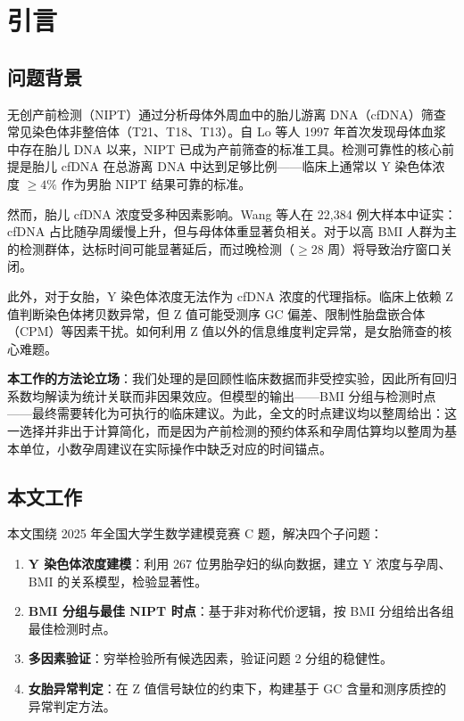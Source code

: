 \documentclass{mcm-paper}
\begin{document}
\tableofcontents
\newpage

\section{引言}

\subsection{问题背景}

无创产前检测（NIPT）通过分析母体外周血中的胎儿游离 DNA（cfDNA）筛查常见染色体非整倍体（T21、T18、T13）。自 Lo 等人 1997 年首次发现母体血浆中存在胎儿 DNA 以来\cite{lo1997}，NIPT 已成为产前筛查的标准工具。检测可靠性的核心前提是胎儿 cfDNA 在总游离 DNA 中达到足够比例——临床上通常以 Y 染色体浓度 $\geq 4\%$ 作为男胎 NIPT 结果可靠的标准。

然而，胎儿 cfDNA 浓度受多种因素影响。Wang 等人在 22,384 例大样本中证实\cite{wang2013}：cfDNA 占比随孕周缓慢上升，但与母体体重显著负相关。对于以高 BMI 人群为主的检测群体，达标时间可能显著延后，而过晚检测（$\geq 28$ 周）将导致治疗窗口关闭。

此外，对于女胎，Y 染色体浓度无法作为 cfDNA 浓度的代理指标。临床上依赖 Z 值判断染色体拷贝数异常，但 Z 值可能受测序 GC 偏差、限制性胎盘嵌合体（CPM）\cite{grati2014}等因素干扰。如何利用 Z 值以外的信息维度判定异常，是女胎筛查的核心难题。

\textbf{本工作的方法论立场}：我们处理的是回顾性临床数据而非受控实验，因此所有回归系数均解读为统计关联而非因果效应。但模型的输出——BMI 分组与检测时点——最终需要转化为可执行的临床建议。为此，全文的时点建议均以整周给出：这一选择并非出于计算简化，而是因为产前检测的预约体系和孕周估算均以整周为基本单位，小数孕周建议在实际操作中缺乏对应的时间锚点。

\subsection{本文工作}

本文围绕 2025 年全国大学生数学建模竞赛 C 题，解决四个子问题：

\begin{enumerate}
    \item \textbf{Y 染色体浓度建模}：利用 267 位男胎孕妇的纵向数据，建立 Y 浓度与孕周、BMI 的关系模型，检验显著性。
    \item \textbf{BMI 分组与最佳 NIPT 时点}：基于非对称代价逻辑，按 BMI 分组给出各组最佳检测时点。
    \item \textbf{多因素验证}：穷举检验所有候选因素，验证问题 2 分组的稳健性。
    \item \textbf{女胎异常判定}：在 Z 值信号缺位的约束下，构建基于 GC 含量和测序质控的异常判定方法。
\end{enumerate}
\end{document}
